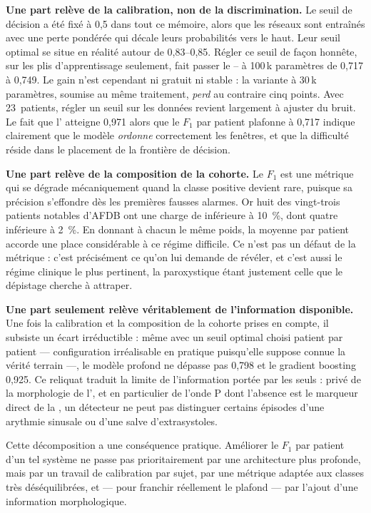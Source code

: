 \textbf{Une part relève de la calibration, non de la discrimination.} Le seuil de décision a été fixé à 0,5 dans tout ce mémoire, alors que les réseaux sont entraînés avec une perte pondérée qui décale leurs probabilités vers le haut. Leur seuil optimal se situe en réalité autour de 0,83--0,85. Régler ce seuil de façon honnête, sur les plis d'apprentissage seulement, fait passer le \CNN--\LSTM{} à 100\,k paramètres de 0,717 à 0,749. Le gain n'est cependant ni gratuit ni stable : la variante à 30\,k paramètres, soumise au même traitement, \emph{perd} au contraire cinq points. Avec 23~patients, régler un seuil sur les données revient largement à ajuster du bruit. Le fait que l'\AUROC{} atteigne 0,971 alors que le \(F_1\) par patient plafonne à 0,717 indique clairement que le modèle \emph{ordonne} correctement les fenêtres, et que la difficulté réside dans le placement de la frontière de décision.

\textbf{Une part relève de la composition de la cohorte.} Le \(F_1\) est une métrique qui se dégrade mécaniquement quand la classe positive devient rare, puisque sa précision s'effondre dès les premières fausses alarmes. Or huit des vingt-trois patients notables d'AFDB ont une charge de \FA{} inférieure à 10~\%, dont quatre inférieure à 2~\%. En donnant à chacun le même poids, la moyenne par patient accorde une place considérable à ce régime difficile. Ce n'est pas un défaut de la métrique : c'est précisément ce qu'on lui demande de révéler, et c'est aussi le régime clinique le plus pertinent, la \FA{} paroxystique étant justement celle que le dépistage cherche à attraper.

\textbf{Une part seulement relève véritablement de l'information disponible.} Une fois la calibration et la composition de la cohorte prises en compte, il subsiste un écart irréductible : même avec un seuil optimal choisi patient par patient — configuration irréalisable en pratique puisqu'elle suppose connue la vérité terrain —, le modèle profond ne dépasse pas 0,798 et le gradient boosting 0,925. Ce reliquat traduit la limite de l'information portée par les \RR{} seuls : privé de la morphologie de l'\ECG{}, et en particulier de l'onde P dont l'absence est le marqueur direct de la \FA{}, un détecteur ne peut pas distinguer certains épisodes d'une arythmie sinusale ou d'une salve d'extrasystoles.

Cette décomposition a une conséquence pratique. Améliorer le \(F_1\) par patient d'un tel système ne passe pas prioritairement par une architecture plus profonde, mais par un travail de calibration par sujet, par une métrique adaptée aux classes très déséquilibrées, et — pour franchir réellement le plafond — par l'ajout d'une information morphologique.

